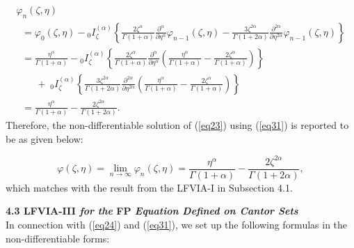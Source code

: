 \documentclass[10pt]{NSP1}
\begin{document}
\begin{equation}
\label{eq42}
\begin{array}{llllll}
 \varphi _n \left( {\zeta ,\eta } \right) \\
\;\; =\varphi _0 \left( {\zeta ,\eta } \right)-{ }_0I_\zeta ^{\left( \alpha
\right)}\left\{ {\frac{2\zeta ^\alpha }{\Gamma \left( {1+\alpha }
\right)}\frac{\partial ^\alpha }{\partial \eta ^\alpha }\varphi _{n-1}
\left( {\zeta ,\eta } \right)-\frac{3\zeta ^{2\alpha }}{\Gamma \left(
{1+2\alpha } \right)}\frac{\partial ^{2\alpha }}{\partial \eta ^{2\alpha
}}\varphi _{n-1} \left( {\zeta ,\eta } \right)} \right\} \\
\;\; =\frac{\eta ^\alpha }{\Gamma \left( {1+\alpha } \right)}-{ }_0I_\zeta
^{\left( \alpha \right)}\left\{ {\frac{2\zeta ^\alpha }{\Gamma \left(
{1+\alpha } \right)}\frac{\partial ^\alpha }{\partial \eta ^\alpha }\left(
{\frac{\eta ^\alpha }{\Gamma \left( {1+\alpha } \right)}-\frac{2\zeta
^\alpha }{\Gamma \left( {1+\alpha } \right)}} \right)} \right\} \\
\qquad +\;_0I_\zeta ^{\left( \alpha \right)}\left\{ {\frac{3\zeta ^{2\alpha
}}{\Gamma \left( {1+2\alpha } \right)}\frac{\partial ^{2\alpha }}{\partial
\eta ^{2\alpha }}\left( {\frac{\eta ^\alpha }{\Gamma \left( {1+\alpha }
\right)}-\frac{2\zeta ^\alpha }{\Gamma \left( {1+\alpha } \right)}} \right)}
\right\} \\
\;\; =\frac{\eta ^\alpha }{\Gamma \left( {1+\alpha } \right)}-\frac{2\zeta
^{2\alpha }}{\Gamma \left( {1+2\alpha } \right)}.
 \end{array}
\end{equation}
Therefore, the non-differentiable solution of (\ref{eq23}) using (\ref{eq31}) is reported
to be as given below:

\begin{equation}
\label{eq43}
\varphi \left( {\zeta ,\eta } \right)=\mathop {\lim }\limits_{n\to \infty }
\varphi _n \left( {\zeta ,\eta } \right)=\frac{\eta ^\alpha }{\Gamma \left(
{1+\alpha } \right)}-\frac{2\zeta ^{2\alpha }}{\Gamma \left( {1+2\alpha }
\right)},
\end{equation}
which matches with the result from the LFVIA-I in Subsection 4.1.\\

\newpage

\noindent
\textbf{4.3 \; LFVIA-III \; \textit{for the} FP \textit{Equation Defined on Cantor Sets}}\\

In connection with (\ref{eq24}) and (\ref{eq31}), we set up the following formulas in the non-differentiable
forms:
\end{document}
